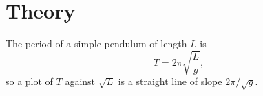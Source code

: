\section{Theory}
\label{sec:theory}
The period of a simple pendulum of length $L$ is
\begin{equation}
  T = 2\pi\sqrt{\frac{L}{g}},
  \label{eq:period}
\end{equation}
so a plot of $T$ against $\sqrt{L}$ is a straight line of slope $2\pi/\sqrt{g}$.
